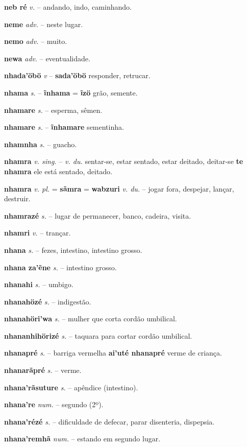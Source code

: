 \textbf{neb ré} \textit{v.} -- andando, indo, caminhando.

\textbf{neme} \textit{adv.} -- neste lugar.

\textbf{nemo} \textit{adv.} -- muito.

\textbf{newa} \textit{adv.} -- eventualidade.

\textbf{nhada'öbö} \textit{v} -- \textbf{sada'öbö} responder, retrucar.

\textbf{nhama} \textit{s.} -- \textbf{ĩnhama} = \textbf{ĩzö} grão, semente.

\textbf{nhamare} \textit{s.} -- esperma, sêmen.

\textbf{nhamare} \textit{s.} -- \textbf{ĩnhamare} sementinha.

\textbf{nhamnha} \textit{s.} -- guacho.

\textbf{nhamra} \textit{v. sing.} -- \textit{v. du.} sentar-se, estar sentado, estar deitado, deitar-se  \textbf{te nhamra} ele está sentado, deitado.

\textbf{nhamra} \textit{v. pl.} = \textbf{sãmra} = \textbf{wabzuri} \textit{v. du.} -- jogar fora, despejar, lançar, destruir.

\textbf{nhamrazé} \textit{s.} -- lugar de permanecer, banco, cadeira, visita.

\textbf{nhamri} \textit{v.} -- trançar.

\textbf{nhana} \textit{s.} -- fezes, intestino, intestino grosso.

\textbf{nhana za'ẽne} \textit{s.} -- intestino grosso.

\textbf{nhanahi} \textit{s.} -- umbigo.

\textbf{nhanahözé} \textit{s.} -- indigestão.

\textbf{nhanahöri'wa} \textit{s.} -- mulher que corta cordão umbilical.

\textbf{nhananhihörizé} \textit{s.} -- taquara para cortar cordão umbilical.

\textbf{nhanapré} \textit{s.} -- barriga vermelha  \textbf{ai'uté nhanapré} verme de criança.

\textbf{nhanarãpré} \textit{s.} -- verme.

\textbf{nhana'rãsuture} \textit{s.} -- apêndice (intestino).

\textbf{nhana're} \textit{num.} -- segundo (2º).

\textbf{nhana'rézé} \textit{s.} -- dificuldade de defecar, parar disenteria, dispepsia.

\textbf{nhana'remhã} \textit{num.} -- estando em segundo lugar.


